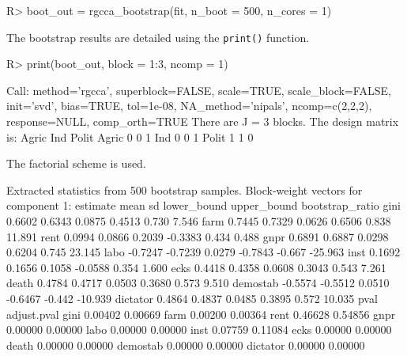 \documentclass[
]{jss}
\begin{document}
\footnotesize

\begin{CodeChunk}
\begin{CodeInput}
R> boot_out = rgcca_bootstrap(fit, n_boot = 500, n_cores = 1)
\end{CodeInput}
\end{CodeChunk}

\normalsize

The bootstrap results are detailed using the \texttt{print()} function.

\footnotesize

\begin{CodeChunk}
\begin{CodeInput}
R> print(boot_out, block = 1:3, ncomp = 1)
\end{CodeInput}
\begin{CodeOutput}
Call: method='rgcca', superblock=FALSE, scale=TRUE, scale_block=FALSE, init='svd',
bias=TRUE, tol=1e-08, NA_method='nipals', ncomp=c(2,2,2), response=NULL,
comp_orth=TRUE 
There are J = 3 blocks.
The design matrix is:
      Agric Ind Polit
Agric     0   0     1
Ind       0   0     1
Polit     1   1     0

The factorial scheme is used.

Extracted statistics from 500 bootstrap samples.
Block-weight vectors for component 1: 
         estimate    mean     sd lower_bound upper_bound bootstrap_ratio
gini       0.6602  0.6343 0.0875      0.4513       0.730           7.546
farm       0.7445  0.7329 0.0626      0.6506       0.838          11.891
rent       0.0994  0.0866 0.2039     -0.3383       0.434           0.488
gnpr       0.6891  0.6887 0.0298      0.6204       0.745          23.145
labo      -0.7247 -0.7239 0.0279     -0.7843      -0.667         -25.963
inst       0.1692  0.1656 0.1058     -0.0588       0.354           1.600
ecks       0.4418  0.4358 0.0608      0.3043       0.543           7.261
death      0.4784  0.4717 0.0503      0.3680       0.573           9.510
demostab  -0.5574 -0.5512 0.0510     -0.6467      -0.442         -10.939
dictator   0.4864  0.4837 0.0485      0.3895       0.572          10.035
            pval adjust.pval
gini     0.00402     0.00669
farm     0.00200     0.00364
rent     0.46628     0.54856
gnpr     0.00000     0.00000
labo     0.00000     0.00000
inst     0.07759     0.11084
ecks     0.00000     0.00000
death    0.00000     0.00000
demostab 0.00000     0.00000
dictator 0.00000     0.00000
\end{CodeOutput}
\end{CodeChunk}
\end{document}
